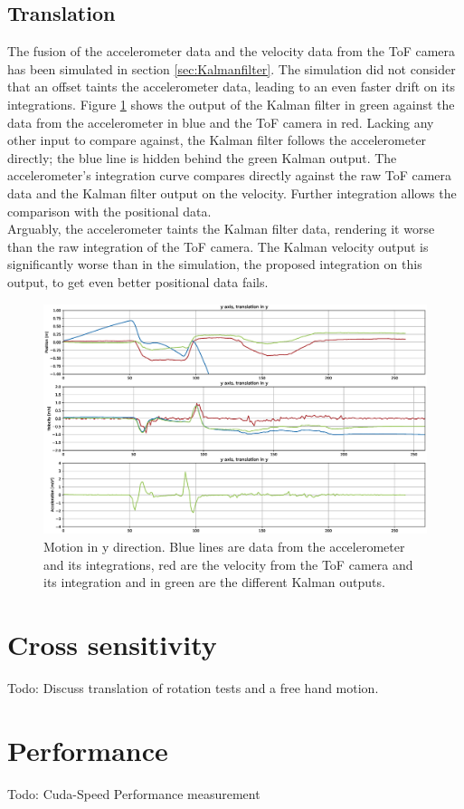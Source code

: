 \subsection{Translation}
\label{sec:kalman_translation_results}
The fusion of the accelerometer data and the velocity data from the ToF camera has been simulated in section \ref{sec:Kalmanfilter}. The simulation did not consider that an offset taints the accelerometer data, leading to an even faster drift on its integrations. Figure \ref{im:meas_kalman_translation} shows the output of the Kalman filter in green against the data from the accelerometer in blue and the ToF camera in red. Lacking any other input to compare against, the Kalman filter follows the accelerometer directly; the blue line is hidden behind the green Kalman output. The accelerometer's integration curve compares directly against the raw ToF camera data and the Kalman filter output on the velocity. Further integration allows the comparison with the positional data.\\
Arguably, the accelerometer taints the Kalman filter data, rendering it worse than the raw integration of the ToF camera. The Kalman velocity output is significantly worse than in the simulation, the proposed integration on this output, to get even better positional data fails.
\begin{figure}[H]
  \centering
  \includegraphics[width=1.0\textwidth]{images/measurement_kalman_translation.eps}
  \caption{Motion in y direction. Blue lines are data from the accelerometer and its integrations, red are the velocity from the ToF camera and its integration and in green are the different Kalman outputs.}
  \label{im:meas_kalman_translation}
\end{figure} 
\section{Cross sensitivity}
\label{sec:cross_sensitivity}
Todo: Discuss translation of rotation tests and a free hand motion.
\section{Performance}
\label{sec:performance}
Todo: Cuda-Speed Performance measurement